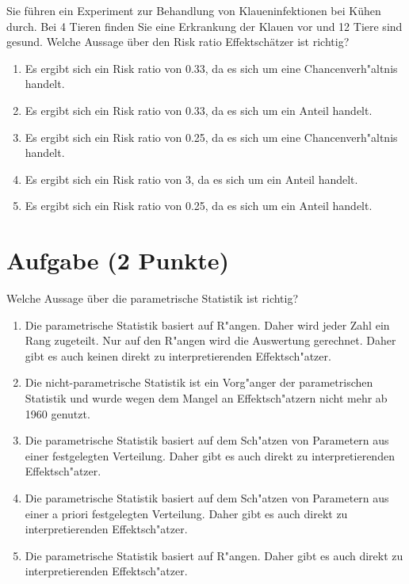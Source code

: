 \documentclass[a4paper, 10pt]{scrartcl}\usepackage[]{graphicx}\usepackage[]{xcolor}
\begin{document}
Sie f{\"u}hren ein Experiment zur Behandlung von Klaueninfektionen bei K{\"u}hen
durch. Bei 4 Tieren finden Sie eine Erkrankung der Klauen vor und
12 Tiere sind gesund. Welche Aussage {\"u}ber den Risk ratio
Effektsch{\"a}tzer ist richtig?



\begin{enumerate}
\item [\textbf{A} \msquare] Es ergibt sich ein Risk ratio von 0.33, da es sich um eine Chancenverh{"a}ltnis handelt.
\item [\textbf{B} \msquare] Es ergibt sich ein Risk ratio von 0.33, da es sich um ein Anteil handelt.
\item [\textbf{C} \msquare] Es ergibt sich ein Risk ratio von 0.25, da es sich um eine Chancenverh{"a}ltnis handelt.
\item [\textbf{D} \msquare] Es ergibt sich ein Risk ratio von 3, da es sich um ein Anteil handelt.
\item [\textbf{E} \msquare] Es ergibt sich ein Risk ratio von 0.25, da es sich um ein Anteil handelt.
\end{enumerate}

\section{Aufgabe \hfill (2 Punkte)}




Welche Aussage {\"u}ber die parametrische Statistik ist richtig?



\begin{enumerate}
\item [\textbf{A} \msquare] Die parametrische Statistik basiert auf R{"a}ngen. Daher wird jeder Zahl ein Rang zugeteilt. Nur auf den R{"a}ngen wird die Auswertung gerechnet. Daher gibt es auch keinen direkt zu interpretierenden Effektsch{"a}tzer.
\item [\textbf{B} \msquare] Die nicht-parametrische Statistik ist ein Vorg{"a}nger der parametrischen Statistik und wurde wegen dem Mangel an Effektsch{"a}tzern nicht mehr ab 1960 genutzt.
\item [\textbf{C} \msquare] Die parametrische Statistik basiert auf dem Sch{"a}tzen von Parametern aus einer festgelegten Verteilung. Daher gibt es auch direkt zu interpretierenden Effektsch{"a}tzer.
\item [\textbf{D} \msquare] Die parametrische Statistik basiert auf dem Sch{"a}tzen von Parametern aus einer a priori festgelegten Verteilung. Daher gibt es auch direkt zu interpretierenden Effektsch{"a}tzer.
\item [\textbf{E} \msquare] Die parametrische Statistik basiert auf R{"a}ngen. Daher gibt es auch direkt zu interpretierenden Effektsch{"a}tzer.
\end{enumerate}
\end{document}
